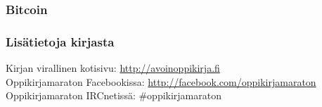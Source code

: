 \subsubsection*{Bitcoin}


\subsubsection*{Lisätietoja kirjasta}

Kirjan virallinen kotisivu: \url{http://avoinoppikirja.fi} \\
Oppikirjamaraton Facebookissa: \url{http://facebook.com/oppikirjamaraton} \\
Oppikirjamaraton IRCnetissä: \#oppikirjamaraton
